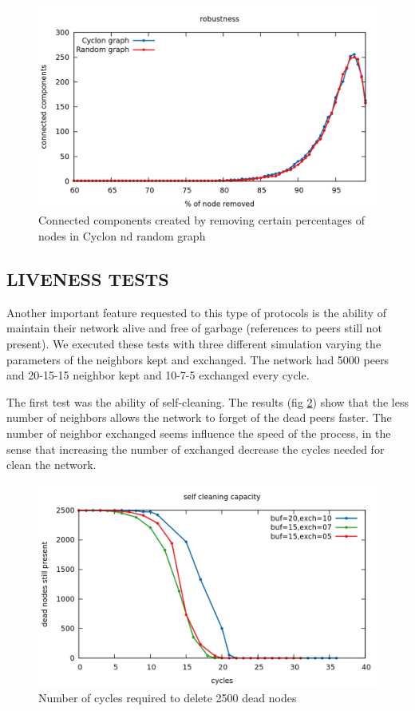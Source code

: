 \documentclass[a4paper,12pt,notitlepage]{article} %
\begin{document}
\begin{figure} [H]
	\centering
	\includegraphics[width=1\textwidth]{img/robustness}
	\caption{Connected components created by removing certain percentages of nodes in Cyclon nd random graph}
	\label{robust}
\end{figure}

 \subsection{LIVENESS TESTS}

Another important feature requested to this type of protocols is the ability of maintain their network
 alive and free of garbage (references to peers still not present). We executed these tests with three different 
 simulation varying the parameters of the neighbors kept and exchanged. The network had 5000 peers and
 20-15-15 neighbor kept and 10-7-5 exchanged every cycle.

The first test was the ability of self-cleaning. The results (fig \ref{sc}) show that the less number of neighbors
 allows the network to forget of the dead peers faster. The number of neighbor exchanged seems influence
 the speed of the process, in the sense that increasing the number of exchanged decrease the cycles needed
 for clean the network.

\begin{figure} [H]
	\centering
	\includegraphics[width=1\textwidth]{img/self_cleaning}
	\caption{Number of cycles required to delete 2500 dead nodes}
	\label{sc}
\end{figure}
\end{document}
